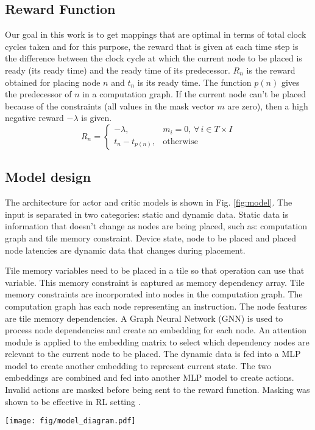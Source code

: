 \subsection{Reward Function}
Our goal in this work is to get mappings that are optimal in terms of total clock cycles taken and for this purpose, the reward that is given at each time step is the difference between the clock cycle at which the current node to be placed is ready (its ready time) and the ready time of its predecessor. 
$R_n$ is the reward obtained for placing node $n$ and $t_n$ is its ready time. 
The function $p(n)$ gives the predecessor of $n$ in a computation graph. 
If the current node can't be placed because of the constraints (all values in the mask vector $m$ are zero), then a high negative reward $-\lambda$ is given.
\[
  R_n =
  \begin{cases}
    -\lambda,& m_i = 0, \, \forall \, i \in T \times I \\
    t_n - t_{p(n)}, & \text{otherwise}
    
  \end{cases}
\]

\subsection{Model design}

The architecture for actor and critic models is shown in Fig. \ref{fig:model}.
The input is separated in two categories: static and dynamic data. 
Static data is information that doesn't change as nodes are being placed, such as: computation graph and tile memory constraint.
Device state, node to be placed and placed node latencies are dynamic data that changes during placement.

Tile memory variables need to be placed in a tile so that operation can use that variable. 
This memory constraint is captured as memory dependency array. 
Tile memory constraints are incorporated into nodes in the computation graph. 
The computation graph has each node representing an instruction. 
The node features are tile memory dependencies. 
A Graph Neural Network (GNN) is used to process node dependencies and create an embedding for each node. 
An attention module is applied to the embedding matrix to select which dependency nodes are relevant to the current node to be placed. The dynamic data is fed into a MLP model to 
create another embedding to represent current state. 
The two embeddings are combined and fed into another MLP model to 
create actions. 
Invalid actions are masked before being sent to the reward function. Masking was shown to be effective in RL setting \cite{Shengyi_mask}.

\begin{figure*}[h]
  \centering
  \texttt{[image: fig/model\_diagram.pdf]}
  \caption{Actor and critic model architecture. GNN is used to process the computation graph (static data). 
  Attention module gives importance to relevant nodes. The embedding created from dynamic data is combined with static data embedding. 
  A final MLP model is used to generate actions. Actions are masked to ensure only valid actions are produced. }
  \label{fig:model}
\end{figure*}

